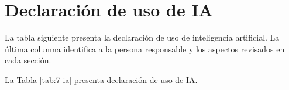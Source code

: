\section*{Declaración de uso de IA}
{}

La tabla siguiente presenta la declaración de uso de inteligencia artificial. La última columna identifica a la persona responsable y los aspectos revisados en cada sección.

La Tabla \ref{tab:7-ia} presenta declaración de uso de IA.

